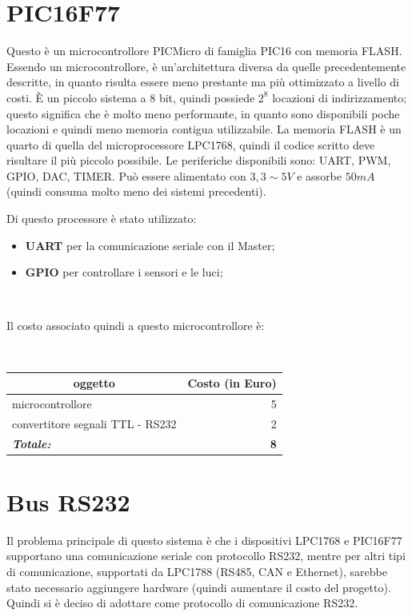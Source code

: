 \documentclass[a4paper,titlepage]{book}
\newcommand{\itema}{\begin{itemize}[noitemsep,topsep=10pt,parsep=5pt,partopsep=10pt]}
\begin{document}
\section{PIC16F77}


Questo è un microcontrollore PICMicro di famiglia PIC16 con memoria FLASH. Essendo un microcontrollore, è un'architettura diversa da quelle precedentemente descritte, in quanto risulta essere meno prestante ma più ottimizzato a livello di costi. È un piccolo sistema a 8 bit, quindi possiede $2^8$ locazioni di indirizzamento; questo significa che è molto meno performante, in quanto sono disponibili poche locazioni e quindi meno memoria contigua utilizzabile. La memoria FLASH è un quarto di quella del microprocessore LPC1768, quindi il codice scritto deve risultare il più piccolo possibile. Le periferiche disponibili sono: UART, PWM, GPIO, DAC, TIMER. Può essere alimentato con $3,3 \sim 5 V$ e assorbe $50 mA$ (quindi consuma molto meno dei sistemi precedenti).

Di questo processore è stato utilizzato:

\itema

\item \textbf{UART} per la comunicazione seriale con il Master;
\item \textbf{GPIO} per controllare i sensori e le luci;
\end{itemize}
 
~

Il costo associato quindi a questo microcontrollore è:

~

\begin{tabular}{|l  r|}
\hline
\multicolumn{1}{|c|}{\textbf {oggetto}} & \multicolumn{1}{c|}{\textbf {Costo (in Euro)}} \\
\hline

microcontrollore			& 5 \\
convertitore segnali TTL - RS232 	& 2  \\
\hline
\hline

\textit{\textbf{Totale:}}		& \textbf{8} \\

\hline
\end{tabular}

\section{Bus RS232}



Il problema principale di questo sistema è che i dispositivi LPC1768 e PIC16F77 supportano una comunicazione seriale con protocollo RS232, mentre per altri tipi di comunicazione, supportati da LPC1788 (RS485, CAN e Ethernet), sarebbe stato necessario aggiungere hardware (quindi aumentare il costo del progetto). Quindi si è deciso di adottare come protocollo di comunicazione RS232.
\end{document}
